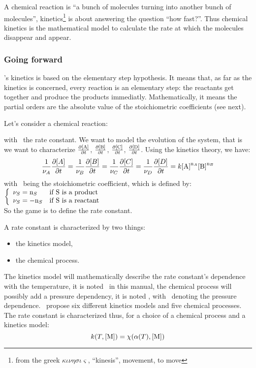 A chemical reaction is ``a bunch of molecules
turning into another bunch of molecules'', kinetics\footnote{%
from the greek $\kappa\iota\nu\eta\sigma\iota\varsigma$, ``kinesis'', movement, to move}
is about answering the question ``how fast?''.
Thus chemical kinetics is the mathematical model
to calculate the rate at which the molecules disappear and
appear.

\subsubsection{Going forward}

\Antioch's kinetics is based on the elementary step
hypothesis. It means that, as far as the kinetics is
concerned, every reaction is an elementary step:
the reactants get together and produce the products
immediatly. Mathematically, it means
the partial orders are the absolute
value of the stoichiometric coefficients (see next).

Let's consider a chemical reaction:
\begin{chemicalEquation}
\label{genericX}
\end{chemicalEquation}
with \rcons\ the rate constant.
We want to model the evolution of the system, that is we want to
characterize 
$\doverdt{\conc[A]}$,
$\doverdt{\conc[B]}$,
$\doverdt{\conc[C]}$,
$\doverdt{\conc[D]}$.
Using the kinetics theory, we have:
\begin{equation}
\frac{1}{\scoef[A]}\doverdt{[A]} = 
\frac{1}{\scoef[B]}\doverdt{[B]} = 
\frac{1}{\scoef[C]}\doverdt{[C]} = 
\frac{1}{\scoef[D]}\doverdt{[D]} = 
\rcons\conc[A]^{\scoefabs[A]}\conc[B]^{\scoefabs[B]}
\label{phys:kinetics_theory}
\end{equation}
with \scoef[A]\ being the stoichiometric coefficient, which is defined by:\\[5pt]
$\left\{\begin{array}{ll}
\scoef[S] = \scoefabs[S] & \text{if \ce{S} is a product} \\
\scoef[S] = -\scoefabs[S] & \text{if \ce{S} is a reactant} \\
\end{array}\right.$\\[5pt]
So the game is to define the rate constant. 

A rate constant is characterized by two things:
\begin{itemize}
\item the kinetics model,
\item the chemical process.
\end{itemize}
The kinetics model will mathematically describe the rate constant's dependence with
the temperature, it is noted \kinMod\ in this manual, the chemical process will
possibly add a pressure dependency, it is noted \chemProc, with \conc[M]\
denoting the pressure dependence.
\Antioch\ propose six different kinetics models and five chemical processes.
The rate constant is characterized thus, for a choice of a chemical process and
a kinetics model:
\begin{equation}
\rateCons = \chemProc
\end{equation}

